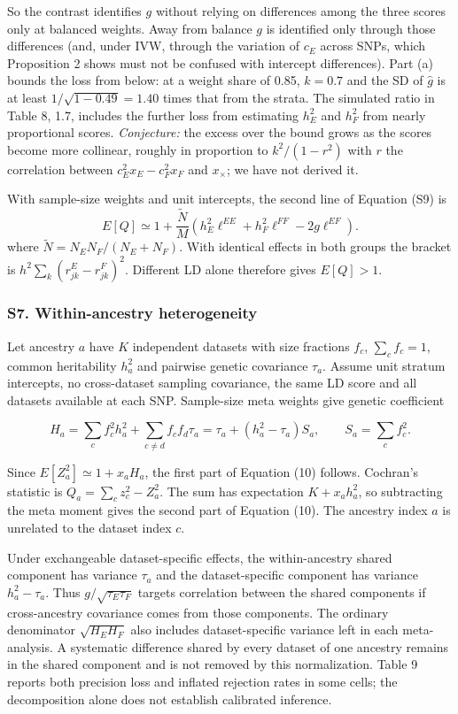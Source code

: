 \documentclass[11pt,a4paper]{article}
\begin{document}
So the contrast identifies \(g\) without relying on differences among the three scores only at balanced weights. Away from balance \(g\) is identified only through those differences (and, under IVW, through the variation of \(c_E\) across SNPs, which Proposition 2 shows must not be confused with intercept differences). Part (a) bounds the loss from below: at a weight share of 0.85, \(k=0.7\) and the SD of \(\hat g\) is at least \(1/\sqrt{1-0.49}=1.40\) times that from the strata. The simulated ratio in Table 8, 1.7, includes the further loss from estimating \(h_E^2\) and \(h_F^2\) from nearly proportional scores. \emph{Conjecture:} the excess over the bound grows as the scores become more collinear, roughly in proportion to \(k^2/(1-r^2)\) with \(r\) the correlation between \(c_E^2x_E-c_F^2x_F\) and \(x_\times\); we have not derived it.

With sample-size weights and unit intercepts, the second line of Equation (S9) is
\[
E[Q]\simeq 1+\frac{\tilde N}{M}\left(h_E^2\ell^{EE}+h_F^2\ell^{FF}-2g\ell^{EF}\right). \tag{S10}
\]
where \(\tilde N=N_EN_F/(N_E+N_F)\). With identical effects in both groups the bracket is \(h^2\sum_k(r^E_{jk}-r^F_{jk})^2\). Different LD alone therefore gives \(E[Q]>1\).

\subsubsection{S7. Within-ancestry heterogeneity}\label{s7-within-ancestry-heterogeneity}

Let ancestry \(a\) have \(K\) independent datasets with size fractions \(f_c\), \(\sum_cf_c=1\), common heritability \(h_a^2\) and pairwise genetic covariance \(\tau_a\). Assume unit stratum intercepts, no cross-dataset sampling covariance, the same LD score and all datasets available at each SNP. Sample-size meta weights give genetic coefficient

\[
H_a=\sum_cf_c^2h_a^2+\sum_{c\ne d}f_cf_d\tau_a
   =\tau_a+(h_a^2-\tau_a)S_a,\qquad S_a=\sum_cf_c^2. \tag{S11}
\]

Since \(E[Z_a^2]\simeq1+x_aH_a\), the first part of Equation (10) follows. Cochran's statistic is \(Q_a=\sum_cz_c^2-Z_a^2\). The sum has expectation \(K+x_ah_a^2\), so subtracting the meta moment gives the second part of Equation (10). The ancestry index \(a\) is unrelated to the dataset index \(c\).

Under exchangeable dataset-specific effects, the within-ancestry shared component has variance \(\tau_a\) and the dataset-specific component has variance \(h_a^2-\tau_a\). Thus \(g/\sqrt{\tau_E\tau_F}\) targets correlation between the shared components if cross-ancestry covariance comes from those components. The ordinary denominator \(\sqrt{H_EH_F}\) also includes dataset-specific variance left in each meta-analysis. A systematic difference shared by every dataset of one ancestry remains in the shared component and is not removed by this normalization. Table 9 reports both precision loss and inflated rejection rates in some cells; the decomposition alone does not establish calibrated inference.
\end{document}
